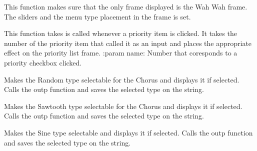 \documentclass[letterpaper,10pt,english]{sphinxmanual}
\begin{document}
\begin{fulllineitems}
\label{Code:GUI.WahWah}
This function makes sure that the only frame displayed is the Wah Wah frame. The sliders and the menu type placement 
in the frame is set.

\end{fulllineitems}


\begin{fulllineitems}
\label{Code:GUI.checkClicked}
This function takes is called whenever a priority item is clicked. It takes the number of the priority item that called it as 
an input and places the appropriate effect on the priority list frame.
:param name: Number that coresponds to a priority checkbox clicked.

\end{fulllineitems}


\begin{fulllineitems}
\label{Code:GUI.chorusRANDOM_val}
Makes the Random type selectable for the Chorus and displays it if selected. Calls the outp function and saves the selected 
type on the string.

\end{fulllineitems}


\begin{fulllineitems}
\label{Code:GUI.chorusSAWTOOTH_val}
Makes the Sawtooth type selectable for the Chorus and displays it if selected. Calls the outp function and saves the selected 
type on the string.

\end{fulllineitems}


\begin{fulllineitems}
\label{Code:GUI.chorusSINE_val}
Makes the Sine type selectable and displays it if selected. Calls the outp function and saves the selected 
type on the string.

\end{fulllineitems}
\end{document}
